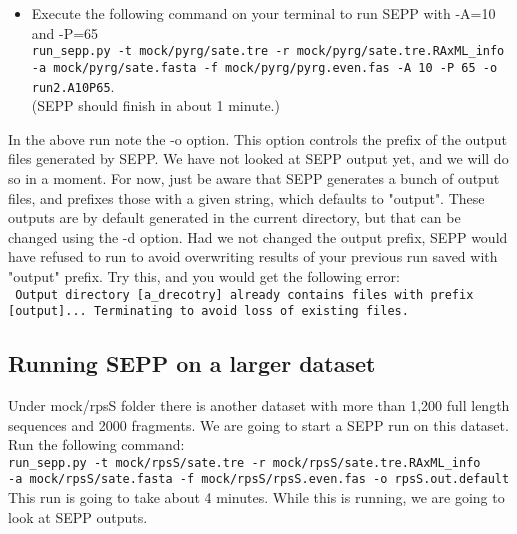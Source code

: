 \documentclass[11pt]{article} %
\newcommand{\sepp}{SEPP\xspace}
\newcommand{\ins}[1]{{\tt #1}}
\newcommand{\file}[1]{{\sf #1}}
\begin{document}
\begin{itemize}
\item Execute the following command on your terminal to run \sepp with -A=10 and -P=65\\

\ins{run\_sepp.py -t mock/pyrg/sate.tre -r mock/pyrg/sate.tre.RAxML\_info -a mock/pyrg/sate.fasta -f mock/pyrg/pyrg.even.fas -A 10 -P 65 -o run2.A10P65}. \\

(\sepp should finish in about 1 minute.)
\end{itemize}

In the above run note the -o option. This option controls the prefix of the output files generated by \sepp. We have not looked at \sepp output yet, and we will do so in a moment. For now, just be aware that \sepp generates a bunch of output files, and prefixes those with a given string, which defaults to "output". These outputs are by default generated in the current directory, but that can be changed using the -d option. Had we not changed the output prefix, \sepp would have refused to run to avoid overwriting results of your previous run saved with "output" prefix. Try this, and you would get the following error:\\

\ins{ Output directory [a\_drecotry] already contains files with prefix [output]...
Terminating to avoid loss of existing files.
}


\subsection{Running \sepp on a larger dataset}
Under \file{mock/rpsS} folder there is another dataset with more than 1,200 full length sequences and 2000 fragments. We are going to start a \sepp run on this dataset. Run the following command:\\

\ins{run\_sepp.py -t mock/rpsS/sate.tre -r mock/rpsS/sate.tre.RAxML\_info \\ -a mock/rpsS/sate.fasta -f mock/rpsS/rpsS.even.fas -o rpsS.out.default}\\

This run is going to take about 4 minutes. While this is running, we are going to look at \sepp outputs. 
\end{document}
